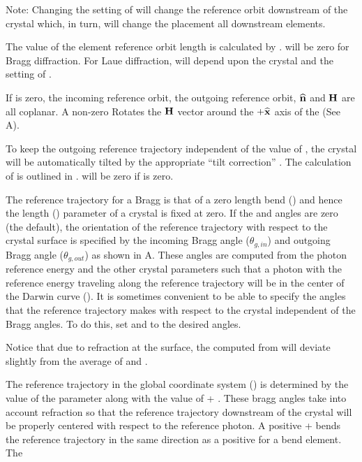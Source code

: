 Note: Changing the setting of  will change the reference orbit downstream of
the crystal which, in turn, will change the placement all downstream elements.

The value of the element reference orbit length  is calculated by \bmad.  will be zero
for Bragg diffraction. For Laue diffraction,  will depend upon the crystal  and
the setting of .

If  is zero, the incoming reference orbit, the outgoing reference orbit, ${\widehat{\bf n}}$
and ${\bf H}$ are all coplanar. A non-zero  Rotates the ${\bf H}$ vector around the $+{\widehat{\bf x}}$ axis of the  (See A).

To keep the outgoing reference trajectory independent of the value of , the crystal
will be automatically tilted by the appropriate ``tilt correction'' . The calculation
of  is outlined in .  will be zero if
 is zero.

The reference trajectory for a Bragg  is that of a zero length bend
() and hence the length () parameter of a crystal is fixed at zero. If
the  and  angles are zero (the default), the orientation of
the reference trajectory with respect to the crystal surface is specified by the incoming Bragg
angle  ($\theta_{g,in}$) and outgoing Bragg angle 
($\theta_{g,out}$) as shown in A. These angles are computed from the photon reference
energy and the other crystal parameters such that a photon with the reference energy traveling along
the reference trajectory will be in the center of the Darwin curve (). It
is sometimes convenient to be able to specify the angles that the reference trajectory makes with
respect to the crystal independent of the Bragg angles. To do this, set  and
 to the desired angles.

Notice that due to refraction at the surface, the computed  from  will
deviate slightly from the average of  and .

The reference trajectory in the global coordinate system () is determined by the
value of the  parameter along with the value of  +
. These bragg angles take into account refraction so that the reference
trajectory downstream of the crystal will be properly centered with respect to the reference
photon. A positive  +  bends the reference trajectory in the
same direction as a positive  for a bend element. The

